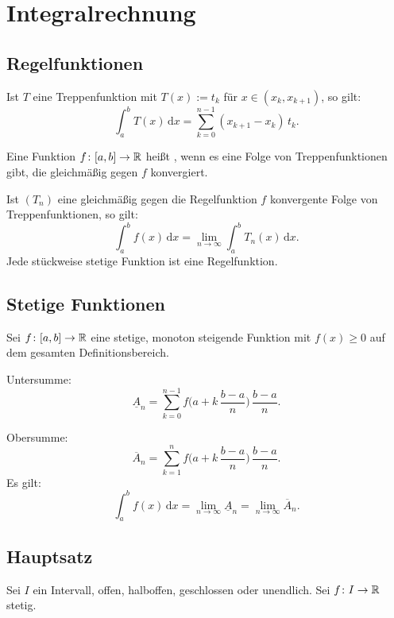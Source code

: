 \section{Integralrechnung}
\subsection{Regelfunktionen}
Ist $T$ eine Treppenfunktion
mit $T(x):=t_k$ für $x\in(x_k,x_{k+1})$,
so gilt:
\begin{equation}
\int_a^b T(x)\,\mathrm dx = \sum_{k=0}^{n-1} (x_{k+1}-x_k)\,t_k.
\end{equation}
\begin{definition}[Regelfunktion]\mbox{}\newline
Eine Funktion $f\colon[a,b]\to\mathbb R$ heißt
, wenn es eine
Folge von Treppenfunktionen gibt, die gleichmäßig gegen $f$
konvergiert.
\end{definition}

Ist $(T_n)$ eine gleichmäßig gegen die Regelfunktion $f$ konvergente
Folge von Treppenfunktionen, so gilt:
\begin{equation}
\int_a^b f(x)\,\mathrm dx = \lim_{n\to\infty} \int_a^b T_n(x)\,\mathrm dx.
\end{equation}
Jede stückweise stetige Funktion ist eine Regelfunktion.

\subsection{Stetige Funktionen}
Sei $f\colon [a,b]\to\mathbb R$ eine stetige, monoton steigende
Funktion mit $f(x)\ge 0$ auf dem gesamten Definitionsbereich.

Untersumme:
\begin{equation}
\underline{A}_n = \sum_{k=0}^{n-1}
f\Big(a+k\,\frac{b-a}{n}\Big)\,\frac{b-a}{n}.
\end{equation}

Obersumme:
\begin{equation}
\overline{A}_n = \sum_{k=1}^{n}
f\Big(a+k\,\frac{b-a}{n}\Big)\,\frac{b-a}{n}.
\end{equation}
Es gilt:
\begin{equation}
\int_a^b f(x)\,\mathrm dx
= \lim_{n\to\infty}\underline A_n
= \lim_{n\to\infty}\overline A_n.
\end{equation}

\subsection{Hauptsatz}
Sei $I$ ein Intervall, offen, halboffen, geschlossen oder unendlich.
Sei $f\colon I\to\mathbb R$ stetig.

